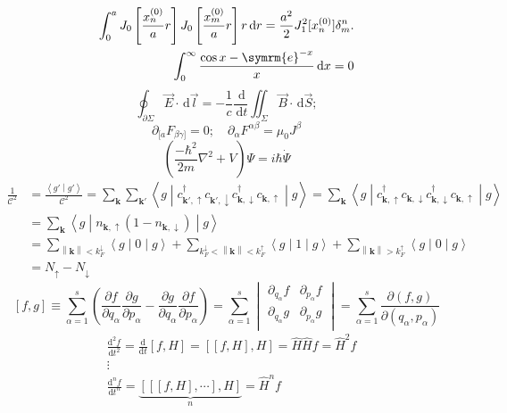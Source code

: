 \documentclass[11pt,fleqn]{article}
\def\ee{\symrm{e}}
\def\bm{\symbf}
\newcommand{\innerprod}[2]{\left\langle{#1}\middle\vert{#2}\right\rangle}
\newcommand{\brakket}[3]{\left\langle{#1}\middle\vert{#2}\middle\vert{#3}\right\rangle}
\newcommand{\dd}{\,\mathrm{d}}
\newcommand{\norm}[1]{\left\lVert{#1}\right\rVert}
\begin{document}
\begin{align*}
\int_{0}^aJ_0\left[\frac{x_n^{(0)}}{a}r\right]J_0\left[\frac{x_m^{(0)}}{a}r\right]r\dd{r}=\frac{a^2}{2}J_1^2[x_n^{(0)}]\delta_m^n.\\
\int_{0}^{\infty}\frac{\cos x-\ee^{-x}}{x}\dd{x}=0\\
\end{align*}
\[\oint_{\partial\Sigma}\vec E\cdot \dd{\vec{l}}=-\frac{1}{c}\frac{\dd}{\dd t}\iint_{\Sigma}\vec B \cdot \dd{\vec{S}};\]
\[\partial_{[a}F_{\beta\gamma]}=0;\quad \partial_\alpha F^{\alpha\beta}=\mu_0J^\beta\]
\[\left(\frac{-\hbar^2}{2m}\nabla^2+V\right)\Psi=i\hbar\dot{\Psi}\]
\[\begin{split}
\frac{1}{\mathcal{C}^2}&{}=\frac{\innerprod{g'}{g'}}{\mathcal{C}^2}=\sum_{\bm{k}}\sum_{\bm{k}'}\brakket{g}{c_{\bm{k}',\uparrow}^\dagger c_{\bm{k}',\downarrow} c_{\bm{k},\downarrow}^\dagger c_{\bm{k},\uparrow}}{g}=\sum_{\bm{k}}\brakket{g}{c_{\bm{k},\uparrow}^\dagger c_{\bm{k},\downarrow} c_{\bm{k},\downarrow}^\dagger c_{\bm{k},\uparrow}}{g}\\
&{}=\sum_{\bm{k}}\brakket{g}{n_{\bm{k},\uparrow}\left(1-n_{\bm{k},\downarrow}\right)}{g}\\
&{}=\sum_{\norm{\bm{k}}<k_F^\downarrow}\brakket{g}{0}{g}+\sum_{k_F^\downarrow<\norm{\bm{k}}<k_F^\uparrow}\brakket{g}{1}{g}+\sum_{\norm{\bm{k}}>k_F^\uparrow}\brakket{g}{0}{g}\\
&{}=N_\uparrow-N_\downarrow
\end{split}\]
\[\left[ f,g \right]\equiv \sum_{\alpha =1}^{s}{\left( \frac{\partial f}{\partial {{q}_{\alpha }}}\frac{\partial g}{\partial {{p}_{\alpha }}}-\frac{\partial g}{\partial {{q}_{\alpha }}}\frac{\partial f}{\partial {{p}_{\alpha }}} \right)}=\sum\limits_{\alpha =1}^{s}{\begin{vmatrix}
	\partial_{{q}_{\alpha }} f & \partial_{{p}_{\alpha }} f  \\
	\partial_{{q}_{\alpha }} g & \partial_{{p}_{\alpha }} g  \\
	\end{vmatrix} }=\sum\limits_{\alpha =1}^{s}{\frac{\partial \left( f,g \right)}{\partial \left( {{q}_{\alpha }},{{p}_{\alpha }} \right)}}\]
\[\begin{split}
& \frac{{{\text{d}}^{2}}f}{\text{d}{{t}^{2}}}=\frac{\text{d}}{\text{d}t}\left[ f,H \right]=\left[ \left[ f,H \right],H \right]=\hat{H}\hat{H}f={{{\hat{H}}}^{2}}f \\ 
& \vdots  \\ 
& \frac{{{\text{d}}^{n}}f}{\text{d}{{t}^{n}}}=\underbrace{\left[ \left[ \left[ f,H \right],\cdots  \right],H \right]}_{n}={{{\hat{H}}}^{n}}f  \\
\end{split}\]
\end{document}
